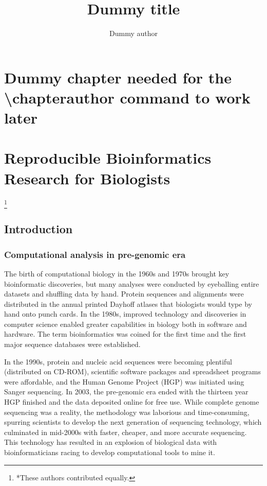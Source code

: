 \documentclass[ChapterTOCs,krantz2]{krantz} %
\begin{document}
\title{Dummy title} \author{Dummy author} \chapter*{Dummy chapter needed for
the \textbackslash chapterauthor command to work later}

\mainmatter



\chapter{Reproducible Bioinformatics Research for Biologists}
\footnote{*These authors contributed equally.}

\section{Introduction}\label{intro}

\subsection{Computational analysis in pre-genomic era}

The birth of computational biology in the 1960s
and 1970s brought key bioinformatic discoveries, but many analyses
were conducted by eyeballing entire datasets and shuffling data by hand.
Protein sequences and alignments were distributed in the annual printed Dayhoff
atlases that biologists would type by hand onto punch cards.  In the 1980s,
improved technology and discoveries in computer science enabled greater
capabilities in biology both in software and hardware.  The term bioinformatics
was coined for the first time and the first major sequence databases were
established. 

In the 1990s, protein and nucleic acid sequences were becoming plentiful
(distributed on CD-ROM), scientific software packages and spreadsheet programs
were affordable, and the Human Genome Project (HGP) was initiated using Sanger
sequencing.  In 2003, the pre-genomic era ended with the thirteen year HGP
finished and the data deposited online for free 
use\cite{Lander2001,Collins2003,HGP}.  While complete genome
sequencing was a reality, the methodology was laborious and time-consuming,
spurring scientists to develop the next generation of sequencing technology,
which culminated in mid-2000s with faster, cheaper, and more accurate
sequencing. This technology has resulted in an explosion of biological data
with bioinformaticians racing to develop computational tools to mine it.  
\end{document}
